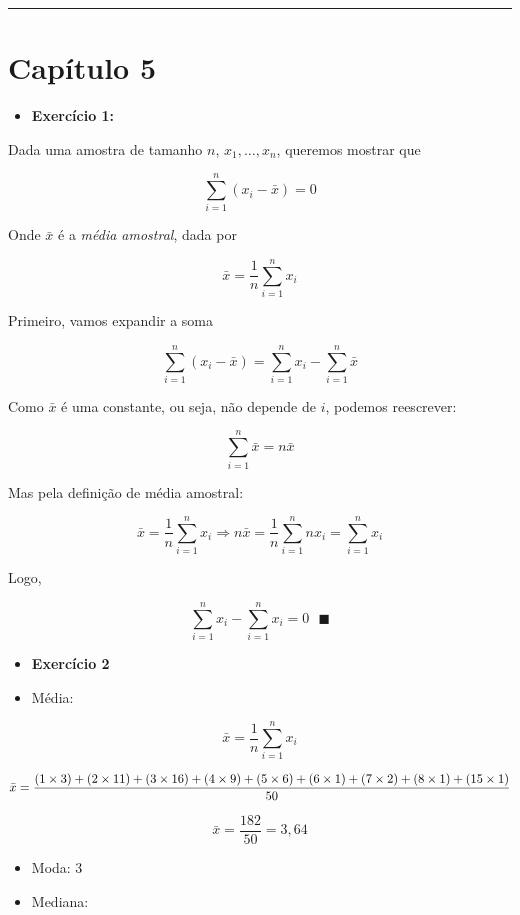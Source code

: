 \documentclass[
]{book}
\providecommand{\tightlist}{%
  \setlength{\itemsep}{0pt}\setlength{\parskip}{0pt}}
\begin{document}
\begin{center}\rule{0.5\linewidth}{0.5pt}\end{center}

\section{Capítulo 5}\label{capuxedtulo-5}

\begin{itemize}
\tightlist
\item
  \textbf{Exercício 1:}
\end{itemize}

Dada uma amostra de tamanho \(n\), \(x_1,\ldots,x_n\), queremos mostrar que

\[
\sum_{i=1}^n (x_i - \bar{x}) = 0
\]

Onde \(\bar{x}\) é a \emph{média amostral}, dada por

\[
\bar{x} = \frac{1}{n}\sum_{i=1}^n x_i 
\]

Primeiro, vamos expandir a soma

\[
\sum_{i=1}^n (x_i - \bar{x}) = \sum_{i=1}^n x_i - \sum_{i=1}^n \bar{x}
\]

Como \(\bar{x}\) é uma constante, ou seja, não depende de \(i\), podemos reescrever:

\[
\sum_{i=1}^n \bar{x} = n \bar{x}
\]

Mas pela definição de média amostral:

\[
\bar{x} = \frac{1}{n}\sum_{i=1}^n x_i  
  \Rightarrow
n \bar{x} = \frac{1}{n}\sum_{i=1}^n nx_i= \sum_{i=1}^n x_i 
\]

Logo,

\[
\sum_{i=1}^n x_i - \sum_{i=1}^n x_i = 0 \text{  } \blacksquare
\]

\begin{itemize}
\item
  \textbf{Exercício 2}
\item
  Média:
\end{itemize}

\[
\bar{x} = \frac{1}{n}\sum_{i=1}^n x_i 
\]

\[
\bar{x} = \frac{(1 \times 3) + (2 \times 11) + (3 \times 16) + (4 \times 9) + (5 \times 6) + (6 \times 1) + (7 \times 2) + (8 \times 1) + (15 \times 1)}{50} \\
\]

\[
\bar{x} = \frac{182}{50}  = 3,64
\]

\begin{itemize}
\item
  Moda: 3
\item
  Mediana:
\end{itemize}
\end{document}
